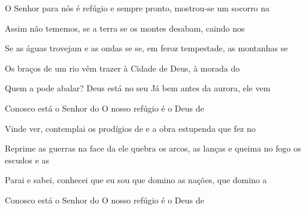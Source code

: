 \begin{greenumerate}
  \item {}O Senhor para nós é refúgio e  sempre pronto, mostrou-se um socorro na 

  \item {}Assim não tememos, se a terra  se os montes desabam, caindo nos 

  \item {}Se as águas trovejam e as ondas se  se, em feroz tempestade, as montanhas se 

  \item {}Os braços de um rio vêm trazer  à Cidade de Deus, à morada do 

  \item {}Quem a pode abalar? Deus está no seu  Já bem antes da aurora, ele vem 

  \item {}Conosco está o Senhor do  O nosso refúgio é o Deus de 

  \item {}Vinde ver, contemplai os prodígios de  e a obra estupenda que fez no 

  \item {}Reprime as guerras na face da  ele quebra os arcos, as lanças  e queima no fogo os escudos e as 

  \item {}Parai e sabei, conhecei que eu sou  que domino as nações, que domino a 

  \item {}Conosco está o Senhor do  O nosso refúgio é o Deus de 
\end{greenumerate}